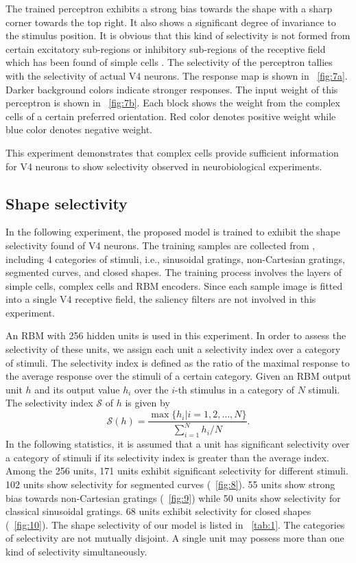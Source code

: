\documentclass[twocolumn]{article}
\begin{document}
The trained perceptron exhibits a strong bias towards the shape with a sharp corner towards the top right.
It also shows a significant degree of invariance to the stimulus position.
It is obvious that this kind of selectivity is not formed from certain excitatory sub-regions
or inhibitory sub-regions of the receptive field which has been found of simple cells \cite{hubel1962,pasupathy2001}.
The selectivity of the perceptron tallies with the selectivity of actual V4 neurons.
The response map is shown in \figurename~\ref{fig:7a}.
Darker background colors indicate stronger responses.
The input weight of this perceptron is shown in \figurename~\ref{fig:7b}.
Each block shows the weight from the complex cells of a certain preferred orientation.
Red color denotes positive weight while blue color denotes negative weight.

This experiment demonstrates that complex cells provide sufficient information for V4 neurons to show selectivity observed in neurobiological experiments.

\subsection{Shape selectivity}

In the following experiment, the proposed model is trained to exhibit the shape selectivity found of V4 neurons.
The training samples are collected from \cite{gallant1996,pasupathy1999,pasupathy2001}, 
including 4 categories of stimuli, i.e., sinusoidal gratings, non-Cartesian gratings, segmented curves, and closed shapes.
The training process involves the layers of simple cells, complex cells and RBM encoders.
Since each sample image is fitted into a single V4 receptive field, the saliency filters are not involved in this experiment.

An RBM with 256 hidden units is used in this experiment.
In order to assess the selectivity of these units, we assign each unit a selectivity index over a category of stimuli.
The selectivity index is defined as the ratio of the maximal response to the average response over the stimuli of a certain category.
Given an RBM output unit $h$ and its output value $h_i$ over the $i$-th stimulus in a category of $N$ stimuli.
The selectivity index $\mathcal{S}$ of $h$ is given by
\begin{equation}
\mathcal{S}(h)=\frac{\max\{h_i|i=1,2,\dots,N\}}{\sum_{i=1}^N h_i/N}.
\end{equation}
In the following statistics, it is assumed that a unit has significant selectivity over a category of stimuli
if its selectivity index is greater than the average index.
Among the 256 units, 171 units exhibit significant selectivity for different stimuli.
102 units show selectivity for segmented curves (\figurename~\ref{fig:8}).
55 units show strong bias towards non-Cartesian gratings (\figurename~\ref{fig:9})
while 50 units show selectivity for classical sinusoidal gratings.
68 units exhibit selectivity for closed shapes (\figurename~\ref{fig:10}).
The shape selectivity of our model is listed in \tablename~\ref{tab:1}.
The categories of selectivity are not mutually disjoint.
A single unit may possess more than one kind of selectivity simultaneously.
\end{document}
